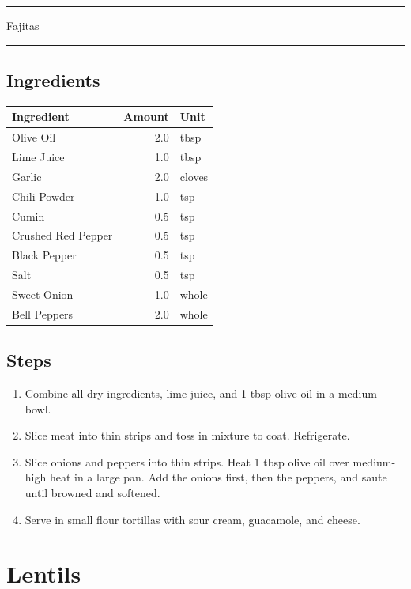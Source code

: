 \documentclass[11pt,]{article}
\begin{document}
\hrule  \vspace{5 mm}

\HUGE Fajitas \normalsize\vspace{5 mm} \hrule 

\subsection{Ingredients}\label{ingredients-2}

\begin{tabular}{l|r|l}
\hline
Ingredient & Amount & Unit\\
\hline
Olive Oil & 2.0 & tbsp\\
\hline
Lime Juice & 1.0 & tbsp\\
\hline
Garlic & 2.0 & cloves\\
\hline
Chili Powder & 1.0 & tsp\\
\hline
Cumin & 0.5 & tsp\\
\hline
Crushed Red Pepper & 0.5 & tsp\\
\hline
Black Pepper & 0.5 & tsp\\
\hline
Salt & 0.5 & tsp\\
\hline
Sweet Onion & 1.0 & whole\\
\hline
Bell Peppers & 2.0 & whole\\
\hline
\end{tabular}

\subsection{Steps}\label{steps-2}

\begin{enumerate}
\def\labelenumi{\arabic{enumi}.}
\item
  Combine all dry ingredients, lime juice, and 1 tbsp olive oil in a
  medium bowl.
\item
  Slice meat into thin strips and toss in mixture to coat. Refrigerate.
\item
  Slice onions and peppers into thin strips. Heat 1 tbsp olive oil over
  medium-high heat in a large pan. Add the onions first, then the
  peppers, and saute until browned and softened.
\item
  Serve in small flour tortillas with sour cream, guacamole, and cheese.
\end{enumerate}

\break 

\section{Lentils}\label{lentils}
\end{document}
